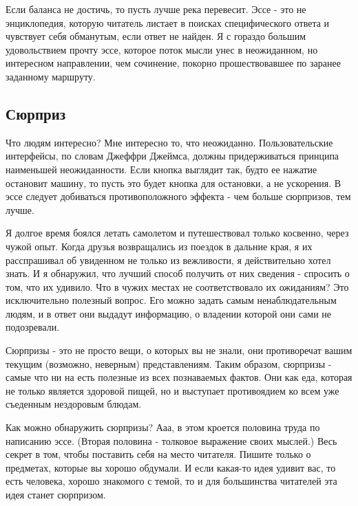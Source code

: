 \documentclass[ebook,12pt,oneside,openany]{memoir}
\begin{document}
Если баланса не достичь, то пусть лучше река перевесит. Эссе - это не
энциклопедия, которую читатель листает в поисках специфического ответа
и чувствует себя обманутым, если ответ не найден. Я с гораздо большим
удовольствием прочту эссе, которое поток мысли унес в неожиданном, но
интересном направлении, чем сочинение, покорно прошествовавшее по
заранее заданному маршруту. \newline

\subsection{Сюрприз}

Что людям интересно? Мне интересно то, что неожиданно.
Пользовательские интерфейсы, по словам Джеффри Джеймса, должны
придерживаться принципа наименьшей неожиданности. Если кнопка выглядит
так, будто ее нажатие остановит машину, то пусть это будет кнопка для
остановки, а не ускорения. В эссе следует добиваться противоположного
эффекта - чем больше сюрпризов, тем лучше. \newline

Я долгое время боялся летать самолетом и путешествовал только
косвенно, через чужой опыт. Когда друзья возвращались из поездок в
дальние края, я их расспрашивал об увиденном не только из вежливости,
я действительно хотел знать. И я обнаружил, что лучший способ получить
от них сведения - спросить о том, что их удивило. Что в чужих местах
не соответствовало их ожиданиям? Это исключительно полезный вопрос.
Его можно задать самым ненаблюдательным людям, и в ответ они выдадут
информацию, о владении которой они сами не подозревали. \newline

Сюрпризы - это не просто вещи, о которых вы не знали, они противоречат
вашим текущим (возможно, неверным) представлениям. Таким образом,
сюрпризы - самые что ни на есть полезные из всех познаваемых фактов.
Они как еда, которая не только является здоровой пищей, но и выступает
противоядием ко всем уже съеденным нездоровым блюдам. \newline

Как можно обнаружить сюрпризы? Ааа, в этом кроется половина труда по
написанию эссе. (Вторая половина - толковое выражение своих мыслей.)
Весь секрет в том, чтобы поставить себя на место читателя. Пишите
только о предметах, которые вы хорошо обдумали. И если какая-то идея
удивит вас, то есть человека, хорошо знакомого с темой, то и для
большинства читателей эта идея станет сюрпризом. \newline
\end{document}

